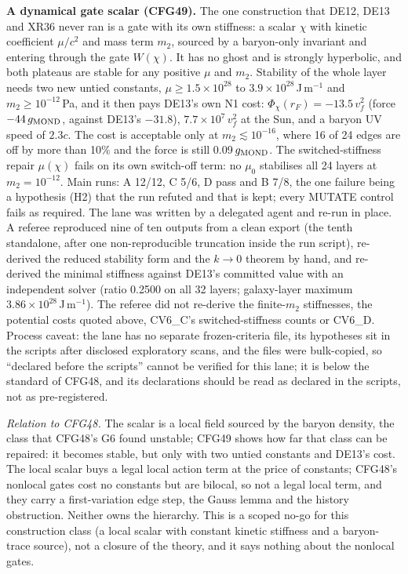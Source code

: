 \documentclass[10pt]{article}
\begin{document}
\textbf{A dynamical gate scalar (CFG49).} The one construction that DE12, DE13 and XR36 never ran is a gate with its own stiffness: a scalar $\chi$ with kinetic coefficient $\mu/c^2$ and mass term $m_2$, sourced by a baryon-only invariant and entering through the gate $W(\chi)$. It has no ghost and is strongly hyperbolic, and both plateaus are stable for any positive $\mu$ and $m_2$. Stability of the whole layer needs two new untied constants, $\mu\ge1.5\times10^{28}$ to $3.9\times10^{28}$\,J\,m$^{-1}$ and $m_2\ge10^{-12}$\,Pa, and it then pays DE13's own N1 cost: $\Phi_\chi(r_F)=-13.5\,v_f^2$ (force $-44\,g_{\rm MOND}$, against DE13's $-31.8$), $7.7\times10^{7}\,v_f^2$ at the Sun, and a baryon UV speed of $2.3c$. The cost is acceptable only at $m_2\lesssim10^{-16}$, where 16 of 24 edges are off by more than 10\% and the force is still 0.09\,$g_{\rm MOND}$. The switched-stiffness repair $\mu(\chi)$ fails on its own switch-off term: no $\mu_0$ stabilises all 24 layers at $m_2=10^{-12}$. Main runs: A 12/12, C 5/6, D pass and B 7/8, the one failure being a hypothesis (H2) that the run refuted and that is kept; every MUTATE control fails as required. The lane was written by a delegated agent and re-run in place. A referee reproduced nine of ten outputs from a clean export (the tenth standalone, after one non-reproducible truncation inside the run script), re-derived the reduced stability form and the $k\to0$ theorem by hand, and re-derived the minimal stiffness against DE13's committed value with an independent solver (ratio 0.2500 on all 32 layers; galaxy-layer maximum $3.86\times10^{28}$\,J\,m$^{-1}$). The referee did not re-derive the finite-$m_2$ stiffnesses, the potential costs quoted above, CV6\_C's switched-stiffness counts or CV6\_D. Process caveat: the lane has no separate frozen-criteria file, its hypotheses sit in the scripts after disclosed exploratory scans, and the files were bulk-copied, so ``declared before the scripts'' cannot be verified for this lane; it is below the standard of CFG48, and its declarations should be read as declared in the scripts, not as pre-registered.

\emph{Relation to CFG48.} The scalar is a local field sourced by the baryon density, the class that CFG48's G6 found unstable; CFG49 shows how far that class can be repaired: it becomes stable, but only with two untied constants and DE13's cost. The local scalar buys a legal local action term at the price of constants; CFG48's nonlocal gates cost no constants but are bilocal, so not a legal local term, and they carry a first-variation edge step, the Gauss lemma and the history obstruction. Neither owns the hierarchy. This is a scoped no-go for this construction class (a local scalar with constant kinetic stiffness and a baryon-trace source), not a closure of the theory, and it says nothing about the nonlocal gates.
\end{document}

